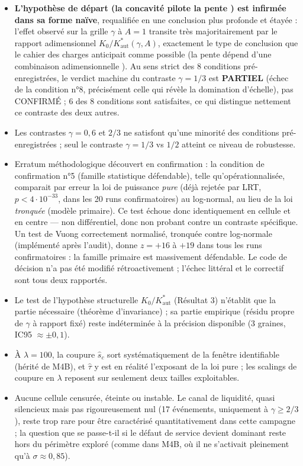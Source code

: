 \documentclass[11pt,a4paper]{article}
\newcommand{\Kaut}{K^{*}_{\mathrm{aut}}}
\begin{document}
\begin{itemize}
\item \textbf{L'hypothèse de départ (\og la concavité pilote la
pente \fg) est infirmée dans sa forme naïve}, requalifiée en une
conclusion plus profonde et étayée : l'effet observé sur la grille
$\gamma$ à $A=1$ transite très majoritairement par le rapport
adimensionnel $K_0/\Kaut(\gamma,A)$, exactement le type de conclusion
que le cahier des charges anticipait comme possible (\og la pente
dépend d'une combinaison adimensionnelle \fg). Au sens strict des 8
conditions pré-enregistrées, le verdict machine du contraste $\gamma=1/3$
est \textbf{PARTIEL} (échec de la condition n°8, précisément celle qui
révèle la domination d'échelle), pas CONFIRMÉ ; 6 des 8 conditions sont
satisfaites, ce qui distingue nettement ce contraste des deux autres.
\item Les contrastes $\gamma=0{,}6$ et $2/3$ ne satisfont qu'une
minorité des conditions pré-enregistrées ; seul le contraste
$\gamma=1/3$ vs $1/2$ atteint ce niveau de robustesse.
\item Erratum méthodologique découvert en confirmation : la condition
de confirmation n°5 (famille statistique défendable), telle
qu'opérationnalisée, comparait par erreur la loi de puissance
\emph{pure} (déjà rejetée par LRT, $p<4\cdot10^{-33}$, dans les 20 runs
confirmatoires) au log-normal, au lieu de la loi \emph{tronquée}
(modèle primaire). Ce test échoue donc identiquement en cellule et en
centre --- non différentiel, donc non probant contre un contraste
spécifique. Un test de Vuong correctement normalisé, tronquée contre
log-normale (implémenté après l'audit), donne $z=+16$ à $+19$ dans tous
les runs confirmatoires : la famille primaire est massivement
défendable. Le code de décision n'a pas été modifié rétroactivement ;
l'échec littéral et le correctif sont tous deux rapportés.
\item Le test de l'hypothèse structurelle $K_0/\Kaut$ (Résultat 3)
n'établit que la partie nécessaire (théorème d'invariance) ; sa partie
empirique (résidu propre de $\gamma$ à rapport fixé) reste indéterminée
à la précision disponible (3 graines, IC95 $\approx\pm0{,}1$).
\item À $\lambda=100$, la coupure $\hat s_c$ sort systématiquement de
la fenêtre identifiable (hérité de M4B), et $\hat\tau$ y est en réalité
l'exposant de la loi pure ; les scalings de coupure en $\lambda$
reposent sur seulement deux tailles exploitables.
\item Aucune cellule censurée, éteinte ou instable. Le canal de
liquidité, quasi silencieux mais pas rigoureusement nul (17 événements,
uniquement à $\gamma\ge2/3$), reste trop rare pour être caractérisé
quantitativement dans cette campagne ; la question \og que se passe-t-il
si le défaut de service devient dominant \fg{} reste hors du périmètre
exploré (comme dans M4B, où il ne s'activait pleinement qu'à
$\sigma\approx0{,}85$).
\end{itemize}
\end{document}
